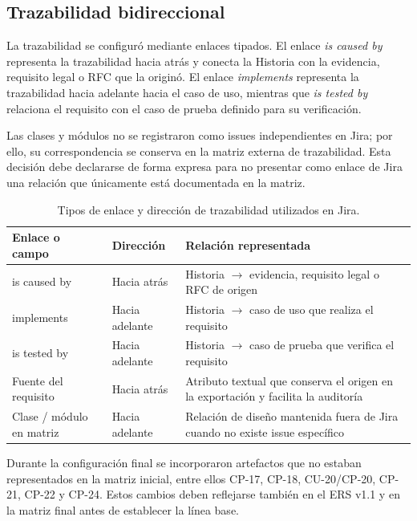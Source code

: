 \documentclass[journal,onecolumn]{IEEEtran}
\begin{document}
	\subsection{Trazabilidad bidireccional}
	
	La trazabilidad se configuró mediante enlaces tipados. El enlace \textit{is caused by} representa la trazabilidad hacia atrás y conecta la Historia con la evidencia, requisito legal o RFC que la originó. El enlace \textit{implements} representa la trazabilidad hacia adelante hacia el caso de uso, mientras que \textit{is tested by} relaciona el requisito con el caso de prueba definido para su verificación.
	
	Las clases y módulos no se registraron como issues independientes en Jira; por ello, su correspondencia se conserva en la matriz externa de trazabilidad. Esta decisión debe declararse de forma expresa para no presentar como enlace de Jira una relación que únicamente está documentada en la matriz.
	
	\begin{table}[h]
		\centering
		\small
		\begin{tabular}{|p{2.8cm}|p{2.2cm}|p{8.5cm}|}
			\hline
			\textbf{Enlace o campo} & \textbf{Dirección} & \textbf{Relación representada} \\
			\hline
			is caused by & Hacia atrás & Historia $\rightarrow$ evidencia, requisito legal o RFC de origen \\
			\hline
			implements & Hacia adelante & Historia $\rightarrow$ caso de uso que realiza el requisito \\
			\hline
			is tested by & Hacia adelante & Historia $\rightarrow$ caso de prueba que verifica el requisito \\
			\hline
			Fuente del requisito & Hacia atrás & Atributo textual que conserva el origen en la exportación y facilita la auditoría \\
			\hline
			Clase / módulo en matriz & Hacia adelante & Relación de diseño mantenida fuera de Jira cuando no existe issue específico \\
			\hline
		\end{tabular}
		\caption{Tipos de enlace y dirección de trazabilidad utilizados en Jira.}
		\label{tab:enlaces}
	\end{table}
	
	Durante la configuración final se incorporaron artefactos que no estaban representados en la matriz inicial, entre ellos CP-17, CP-18, CU-20/CP-20, CP-21, CP-22 y CP-24. Estos cambios deben reflejarse también en el ERS v1.1 y en la matriz final antes de establecer la línea base.
	
\end{document}

